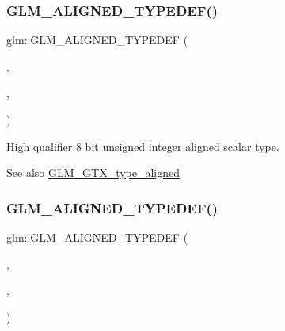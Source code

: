 \subsubsection{\texorpdfstring{G\+L\+M\+\_\+\+A\+L\+I\+G\+N\+E\+D\+\_\+\+T\+Y\+P\+E\+D\+E\+F()}{GLM\_ALIGNED\_TYPEDEF()}\hspace{0.1cm}{\footnotesize\ttfamily [97/209]}}
{\footnotesize\ttfamily glm\+::\+G\+L\+M\+\_\+\+A\+L\+I\+G\+N\+E\+D\+\_\+\+T\+Y\+P\+E\+D\+EF (\begin{DoxyParamCaption}\item[{\hyperlink{group__gtc__type__precision_ga9ba529fcc75b82d23da979f0ce6e4518}{highp\+\_\+uint8\+\_\+t}}]{,  }\item[{aligned\+\_\+highp\+\_\+uint8\+\_\+t}]{,  }\item[{1}]{ }\end{DoxyParamCaption})}

High qualifier 8 bit unsigned integer aligned scalar type. \begin{DoxySeeAlso}{See also}
\hyperlink{group__gtx__type__aligned}{G\+L\+M\+\_\+\+G\+T\+X\+\_\+type\+\_\+aligned} 
\end{DoxySeeAlso}
\mbox{\label{group__gtx__type__aligned_ga9fc4421dbb833d5461e6d4e59dcfde55}} 
\subsubsection{\texorpdfstring{G\+L\+M\+\_\+\+A\+L\+I\+G\+N\+E\+D\+\_\+\+T\+Y\+P\+E\+D\+E\+F()}{GLM\_ALIGNED\_TYPEDEF()}\hspace{0.1cm}{\footnotesize\ttfamily [98/209]}}
{\footnotesize\ttfamily glm\+::\+G\+L\+M\+\_\+\+A\+L\+I\+G\+N\+E\+D\+\_\+\+T\+Y\+P\+E\+D\+EF (\begin{DoxyParamCaption}\item[{\hyperlink{group__gtc__type__precision_ga3145bc0ee80432c165e985a188a722b3}{highp\+\_\+uint16\+\_\+t}}]{,  }\item[{aligned\+\_\+highp\+\_\+uint16\+\_\+t}]{,  }\item[{2}]{ }\end{DoxyParamCaption})}

